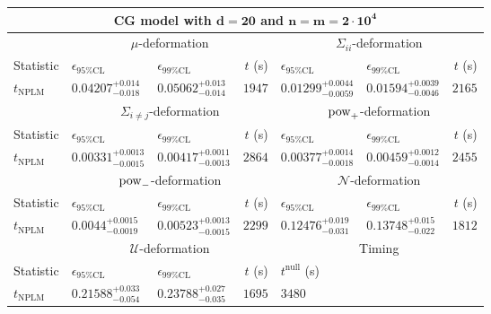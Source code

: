 \begin{tabular}{l|llr|llr}
	\toprule
	\multicolumn{7}{c}{{\bf CG model with $\mathbf{d=20}$ and $\mathbf{n=m=2\cdot 10^{4}}$}} \\
	\toprule
	\multicolumn{1}{c}{} & \multicolumn{3}{c}{$\mu$-deformation} & \multicolumn{3}{c}{$\Sigma_{ii}$-deformation} \\
	Statistic & $\epsilon_{95\%\mathrm{CL}}$ & $\epsilon_{99\%\mathrm{CL}}$ & $t$ (s) & $\epsilon_{95\%\mathrm{CL}}$ & $\epsilon_{99\%\mathrm{CL}}$ & $t$ (s) \\
	\midrule
	$t_{\mathrm{NPLM}}$ & $0.04207_{-0.018}^{+0.014}$ & $0.05062_{-0.014}^{+0.013}$ & $1947$ & $0.01299_{-0.0059}^{+0.0044}$ & $0.01594_{-0.0046}^{+0.0039}$ & $2165$ \\
	\toprule
	\multicolumn{1}{c}{} & \multicolumn{3}{c}{$\Sigma_{i\neq j}$-deformation} & \multicolumn{3}{c}{$\rm{pow}_{+}$-deformation} \\
	Statistic & $\epsilon_{95\%\mathrm{CL}}$ & $\epsilon_{99\%\mathrm{CL}}$ & $t$ (s) & $\epsilon_{95\%\mathrm{CL}}$ & $\epsilon_{99\%\mathrm{CL}}$ & $t$ (s) \\
	\midrule
	$t_{\mathrm{NPLM}}$ & $0.00331_{-0.0015}^{+0.0013}$ & $0.00417_{-0.0013}^{+0.0011}$ & $2864$ & $0.00377_{-0.0018}^{+0.0014}$ & $0.00459_{-0.0014}^{+0.0012}$ & $2455$ \\
	\toprule
	\multicolumn{1}{c}{} & \multicolumn{3}{c}{$\rm{pow}_{-}$-deformation} & \multicolumn{3}{c}{$\mathcal{N}$-deformation} \\
	Statistic & $\epsilon_{95\%\mathrm{CL}}$ & $\epsilon_{99\%\mathrm{CL}}$ & $t$ (s) & $\epsilon_{95\%\mathrm{CL}}$ & $\epsilon_{99\%\mathrm{CL}}$ & $t$ (s) \\
	\midrule
	$t_{\mathrm{NPLM}}$ & $0.0044_{-0.0019}^{+0.0015}$ & $0.00523_{-0.0015}^{+0.0013}$ & $2299$ & $0.12476_{-0.031}^{+0.019}$ & $0.13748_{-0.022}^{+0.015}$ & $1812$ \\
	\toprule
	\multicolumn{1}{c}{} & \multicolumn{3}{c}{$\mathcal{U}$-deformation} & \multicolumn{3}{c}{Timing} \\
	Statistic & $\epsilon_{95\%\mathrm{CL}}$ & $\epsilon_{99\%\mathrm{CL}}$ & $t$ (s) & $t^{\mathrm{null}}$ (s) \\
	\midrule
	$t_{\mathrm{NPLM}}$ & $0.21588_{-0.054}^{+0.033}$ & $0.23788_{-0.035}^{+0.027}$ & $1695$ & $3480$ \\
	\bottomrule
\end{tabular}